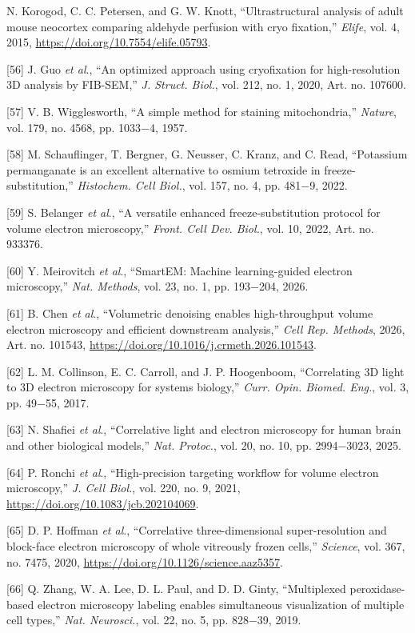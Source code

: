 \documentclass{article}
\begin{document}
\begin{hangpars}
[55] N. Korogod, C. C. Petersen, and G. W. Knott, “Ultrastructural analysis of adult mouse neocortex comparing aldehyde perfusion with cryo fixation,” \emph{Elife}, vol. 4, 2015, \url{https://doi.org/10.7554/elife.05793}.

[56] J. Guo \emph{et al}., “An optimized approach using cryofixation for high-resolution 3D analysis by FIB-SEM,” \emph{J. Struct. Biol.}, vol. 212, no. 1, 2020, Art. no. 107600.

[57] V. B. Wigglesworth, “A simple method for staining mitochondria,” \emph{Nature}, vol. 179, no. 4568, pp. 1033−4, 1957.

[58] M. Schauflinger, T. Bergner, G. Neusser, C. Kranz, and C. Read, “Potassium permanganate is an excellent alternative to osmium tetroxide in freeze-substitution,” \emph{Histochem. Cell Biol.}, vol. 157, no. 4, pp. 481−9, 2022.

[59] S. Belanger \emph{et al}., “A versatile enhanced freeze-substitution protocol for volume electron microscopy,” \emph{Front. Cell Dev. Biol.}, vol. 10, 2022, Art. no. 933376.

[60] Y. Meirovitch \emph{et al}., “SmartEM: Machine learning-guided electron microscopy,” \emph{Nat. Methods}, vol. 23, no. 1, pp. 193−204, 2026.

[61] B. Chen \emph{et al}., “Volumetric denoising enables high-throughput volume electron microscopy and efficient downstream analysis,” \emph{Cell Rep. Methods}, 2026, Art. no. 101543, \url{https://doi.org/10.1016/j.crmeth.2026.101543}.

[62] L. M. Collinson, E. C. Carroll, and J. P. Hoogenboom, “Correlating 3D light to 3D electron microscopy for systems biology,” \emph{Curr. Opin. Biomed. Eng.}, vol. 3, pp. 49−55, 2017.

[63] N. Shafiei \emph{et al}., “Correlative light and electron microscopy for human brain and other biological models,” \emph{Nat. Protoc.}, vol. 20, no. 10, pp. 2994−3023, 2025.

[64] P. Ronchi \emph{et al}., “High-precision targeting workflow for volume electron microscopy,” \emph{J. Cell Biol.}, vol. 220, no. 9, 2021, \url{https://doi.org/10.1083/jcb.202104069}.

[65] D. P. Hoffman \emph{et al}., “Correlative three-dimensional super-resolution and block-face electron microscopy of whole vitreously frozen cells,” \emph{Science}, vol. 367, no. 7475, 2020, \url{https://doi.org/10.1126/science.aaz5357}.

[66] Q. Zhang, W. A. Lee, D. L. Paul, and D. D. Ginty, “Multiplexed peroxidase-based electron microscopy labeling enables simultaneous visualization of multiple cell types,” \emph{Nat. Neurosci.}, vol. 22, no. 5, pp. 828−39, 2019.


\end{hangpars}
\end{document}
